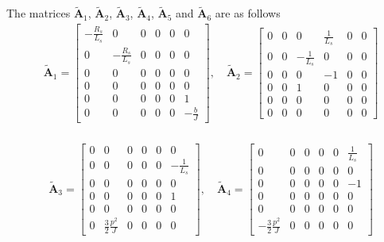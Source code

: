 \documentclass[12pt,a4paper,oneside]{book}
\begin{document}
\begin{onehalfspace}
The matrices $\tilde{\mathbf{A}}_1$, $\tilde{\mathbf{A}}_2$, 
$\tilde{\mathbf{A}}_3$, $\tilde{\mathbf{A}}_4$, $\tilde{\mathbf{A}}_5$ and $\tilde{\mathbf{A}}_6$ are as follows
\begin{equation}\label{}
	\begin{aligned}
		&\tilde{\mathbf{A}}_1 = 
		\begin{bmatrix} 
			-\frac{R_s}{L_s} & 0 & 0 & 0 & 0 & 0 \\[6pt]			
			0 & -\frac{R_s}{L_s} & 0 & 0 & 0 & 0 \\[6pt]
			0 & 0 & 0 & 0 & 0 & 0 \\[6pt]
			0 & 0 & 0 & 0 & 0 & 0 \\[6pt]
			0 & 0 & 0 & 0 & 0 & 1 \\[6pt]
			0 & 0 & 0 & 0 & 0 & -\frac{b}{J}
		\end{bmatrix},\quad
		\tilde{\mathbf{A}}_2 = 
		\begin{bmatrix} 
			0 & 0 & 0 & \frac{1}{L_s} & 0 & 0 \\[6pt]			
			0 & 0 & -\frac{1}{L_s} & 0 & 0 & 0 \\[6pt]
			0 & 0 & 0 & -1 & 0 & 0 \\[6pt]
			0 & 0 & 1 & 0 & 0 & 0 \\[6pt]
			0 & 0 & 0 & 0 & 0 & 0 \\[6pt]
			0 & 0 & 0 & 0 & 0 & 0
		\end{bmatrix} \\[8pt]
	\end{aligned}
\end{equation}

\begin{equation}
	\begin{aligned}
		&\tilde{\mathbf{A}}_3 = 
		\begin{bmatrix} 
			0 & 0 & 0 & 0 & 0 & 0 \\[6pt]			
			0 & 0 & 0 & 0 & 0 & -\frac{1}{L_s} \\[6pt]
			0 & 0 & 0 & 0 & 0 & 0 \\[6pt]
			0 & 0 & 0 & 0 & 0 & 1 \\[6pt]
			0 & 0 & 0 & 0 & 0 & 0 \\[6pt]
			0 & \frac{3}{2}\frac{p^2}{J} & 0 & 0 & 0 & 0
		\end{bmatrix},\quad
		\tilde{\mathbf{A}}_4 = 
		\begin{bmatrix} 
			0 & 0 & 0 & 0 & 0 & \frac{1}{L_s} \\[6pt]			
			0 & 0 & 0 & 0 & 0 & 0 \\[6pt]
			0 & 0 & 0 & 0 & 0 & -1 \\[6pt]
			0 & 0 & 0 & 0 & 0 & 0 \\[6pt]
			0 & 0 & 0 & 0 & 0 & 0 \\[6pt]
			-\frac{3}{2}\frac{p^2}{J} & 0 & 0 & 0 & 0 & 0
		\end{bmatrix} 
	\end{aligned}
\end{equation} 


\end{onehalfspace}
\end{document}
